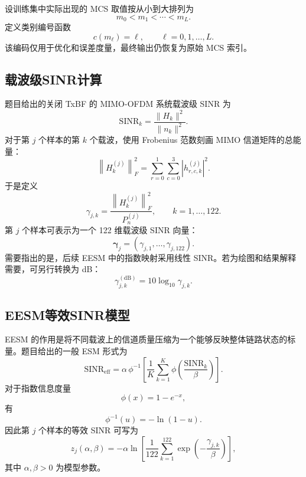 \documentclass[bwprint]{gmcmthesis}
\numberwithin{figure}{section}
\begin{document}
设训练集中实际出现的 MCS 取值按从小到大排列为
\begin{equation}
	m_0<m_1<\cdots<m_L.
\end{equation}
定义类别编号函数
\begin{equation}
	c(m_\ell)=\ell,
	\qquad \ell=0,1,\ldots,L.
	\label{eq:order-encode}
\end{equation}
该编码仅用于优化和误差度量，最终输出仍恢复为原始 MCS 索引。

\subsection{载波级SINR计算}

题目给出的关闭 TxBF 的 MIMO-OFDM 系统载波级 SINR 为
\begin{equation}
	\mathrm{SINR}_k=\frac{\|H_k\|^2}{\|n_k\|^2}.
\end{equation}
对于第 $j$ 个样本的第 $k$ 个载波，使用 Frobenius 范数刻画 MIMO 信道矩阵的总能量：
\begin{equation}
	\left\|H_k^{(j)}\right\|_F^2
	=
	\sum_{r=0}^{1}\sum_{c=0}^{3}\left|h_{r,c,k}^{(j)}\right|^2.
\end{equation}
于是定义
\begin{equation}
	\boxed{
	\gamma_{j,k}
	=
	\frac{\left\|H_k^{(j)}\right\|_F^2}{P_n^{(j)}},
	\qquad k=1,\ldots,122.
	}
	\label{eq:sinr-subcarrier}
\end{equation}
第 $j$ 个样本可表示为一个 122 维载波级 SINR 向量：
\begin{equation}
	\boldsymbol{\gamma}_j=\left(\gamma_{j,1},\ldots,\gamma_{j,122}\right).
\end{equation}
需要指出的是，后续 EESM 中的指数映射采用线性 SINR。若为绘图和结果解释需要，可另行转换为 dB：
\begin{equation}
	\gamma_{j,k}^{(\mathrm{dB})}=10\log_{10}\gamma_{j,k}.
\end{equation}

\subsection{EESM等效SINR模型}

EESM 的作用是将不同载波上的信道质量压缩为一个能够反映整体链路状态的标量。题目给出的一般 ESM 形式为
\begin{equation}
	\mathrm{SINR}_{\mathrm{eff}}
	=
	\alpha\,\phi^{-1}\left[\frac{1}{K}\sum_{k=1}^{K}\phi\left(\frac{\mathrm{SINR}_k}{\beta}\right)\right].
	\label{eq:esm-general}
\end{equation}
对于指数信息度量
\begin{equation}
	\phi(x)=1-e^{-x},
\end{equation}
有
\begin{equation}
	\phi^{-1}(u)=-\ln(1-u).
\end{equation}
因此第 $j$ 个样本的等效 SINR 可写为
\begin{equation}
	z_j(\alpha,\beta)
	=
	-\alpha\ln\left[\frac{1}{122}\sum_{k=1}^{122}\exp\left(-\frac{\gamma_{j,k}}{\beta}\right)\right],
\end{equation}
其中 $\alpha,\beta>0$ 为模型参数。
\end{document}
